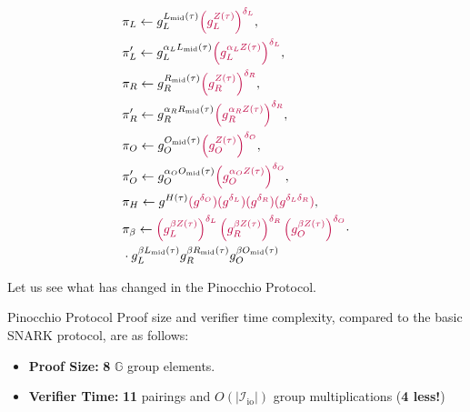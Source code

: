 \documentclass[../lecture-notes.tex]{subfiles}
\begin{document}
\vspace{-7mm}

\begin{center}    
    \begin{equation*}
        \begin{aligned}    
            &\pi_L \gets g_L^{L_{\text{mid}}(\tau)}\textcolor{purple}{\left(g_L^{Z(\tau)}\right)^{\delta_L}}, \\ 
            &\pi_L' \gets g_L^{\alpha_LL_{\text{mid}}(\tau)}\textcolor{purple}{\left(g_L^{\alpha_L Z(\tau)}\right)^{\delta_L}}, \\
            &\pi_R \gets g_R^{R_{\text{mid}}(\tau)}\textcolor{purple}{\left(g_R^{Z(\tau)}\right)^{\delta_R}}, \\ 
            &\pi_R' \gets g_R^{\alpha_RR_{\text{mid}}(\tau)}\textcolor{purple}{\left(g_R^{\alpha_R Z(\tau)}\right)^{\delta_R}}, \\
            &\pi_O \gets g_O^{O_{\text{mid}}(\tau)}\textcolor{purple}{\left(g_O^{Z(\tau)}\right)^{\delta_O}}, \\
            &\pi_O' \gets g_O^{\alpha_OO_{\text{mid}}(\tau)}\textcolor{purple}{\left(g_O^{\alpha_O Z(\tau)}\right)^{\delta_O}}, \\
            &\pi_H \gets g^{H(\tau)}\textcolor{purple}{(g^{\delta_O})(g^{\delta_L})(g^{\delta_R})(g^{\delta_L\delta_R})}, \\ 
            &\pi_{\beta} \gets \textcolor{purple}{\left(g_L^{\beta Z(\tau)}\right)^{\delta_L}\left(g_R^{\beta Z(\tau)}\right)^{\delta_R}\left(g_O^{\beta Z(\tau)}\right)^{\delta_O}} \cdot \\ &  \cdot g_L^{\beta L_{\text{mid}}(\tau)}g_R^{\beta R_{\text{mid}}(\tau)}g_O^{\beta O_{\text{mid}}(\tau)}
        \end{aligned}
    \end{equation*}
\end{center}

Let us see what has changed in the Pinocchio Protocol.

\begin{proposition}{Pinocchio Protocol}
    Proof size and verifier time complexity, compared to the basic SNARK protocol, are as follows:
    \begin{itemize}
        \item \textbf{Proof Size:} \textbf{8} $\mathbb{G}$ group elements.
        \item \textbf{Verifier Time:} \textbf{11} pairings and $O(|\mathcal{I}_{\text{io}}|)$ group multiplications (\textbf{4 less!})
    \end{itemize}
\end{proposition}
\end{document}
